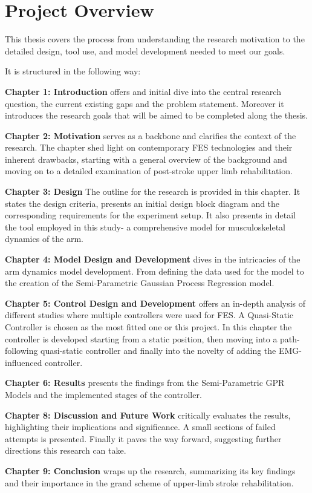 \section{Project Overview}

This thesis covers the process from understanding the research motivation to the detailed design, tool use, and model development needed to meet our goals.

It is structured in the following way:

\textbf{Chapter 1: Introduction} offers and initial dive into the central research question, the current existing gaps and the problem statement. Moreover it introduces the research goals that will be aimed to be completed along the thesis.

\textbf{Chapter 2: Motivation} serves as a backbone and clarifies the context of the research. The chapter shed light on contemporary FES technologies and their inherent drawbacks, starting with a general overview of the background and moving on to a detailed examination of post-stroke upper limb rehabilitation.

\textbf{Chapter 3: Design} The outline for the research is provided in this chapter. It states the design criteria, presents an initial design block diagram and the corresponding requirements for the experiment setup. It also presents in detail the tool employed in this study- a comprehensive model for musculoskeletal dynamics of the arm. 

\textbf{Chapter 4: Model Design and Development} dives in the intricacies of the arm dynamics model development. From defining the data used for the model to the creation of the Semi-Parametric Gaussian Process Regression model.

\textbf{Chapter 5: Control Design and Development} offers an in-depth analysis of different studies where multiple controllers were used for FES. A Quasi-Static Controller is chosen as the most fitted one or this project. In this chapter the controller is developed starting from a static position, then moving into a path-following quasi-static controller and finally into the novelty of adding the EMG-influenced controller.

\textbf{Chapter 6: Results} presents the findings from the Semi-Parametric GPR Models and the implemented stages of the controller.

\textbf{Chapter 8: Discussion and Future Work} critically evaluates the results, highlighting their implications and significance. A small sections of failed attempts is presented. Finally it paves the way forward, suggesting further directions this research can take.

\textbf{Chapter 9: Conclusion} wraps up the research, summarizing its key findings and their importance in the grand scheme of upper-limb stroke rehabilitation. 